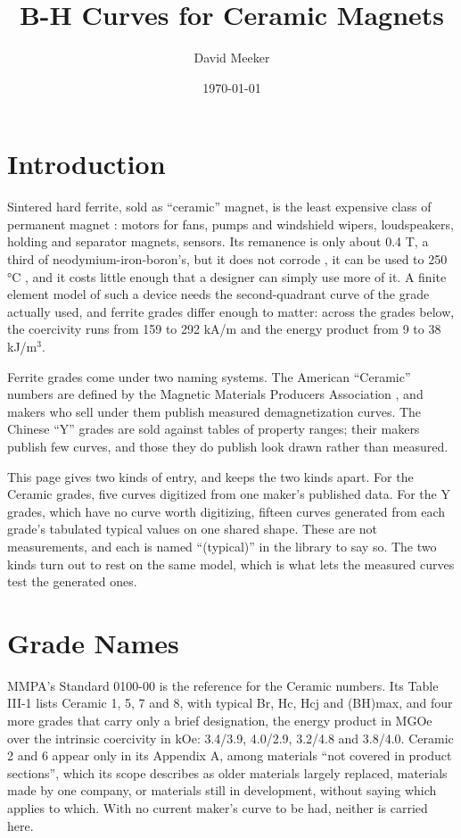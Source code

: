 \documentclass[
  11pt,
]{article}
\title{B-H Curves for Ceramic Magnets}
\author{David Meeker}
\date{\today}
\begin{document}
\maketitle

\section{Introduction}\label{introduction}

Sintered hard ferrite, sold as ``ceramic'' magnet, is the least expensive class of permanent magnet \cite{dexter}: motors for fans, pumps and windshield wipers, loudspeakers, holding and separator magnets, sensors. Its remanence is only about 0.4 T, a third of neodymium-iron-boron's, but it does not corrode \cite{eclipse}, it can be used to 250 °C \cite{dexter}, and it costs little enough that a designer can simply use more of it. A finite element model of such a device needs the second-quadrant curve of the grade actually used, and ferrite grades differ enough to matter: across the grades below, the coercivity runs from 159 to 292 kA/m and the energy product from 9 to 38 kJ/m\(^3\).

Ferrite grades come under two naming systems. The American ``Ceramic'' numbers are defined by the Magnetic Materials Producers Association \cite{mmpa}, and makers who sell under them publish measured demagnetization curves. The Chinese ``Y'' grades are sold against tables of property ranges; their makers publish few curves, and those they do publish look drawn rather than measured.

This page gives two kinds of entry, and keeps the two kinds apart. For the Ceramic grades, five curves digitized from one maker's published data. For the Y grades, which have no curve worth digitizing, fifteen curves generated from each grade's tabulated typical values on one shared shape. These are not measurements, and each is named ``(typical)'' in the library to say so. The two kinds turn out to rest on the same model, which is what lets the measured curves test the generated ones.

\section{Grade Names}\label{grade-names}

MMPA's Standard 0100-00 \cite{mmpa} is the reference for the Ceramic numbers. Its Table III-1 lists Ceramic 1, 5, 7 and 8, with typical Br, Hc, Hcj and (BH)max, and four more grades that carry only a brief designation, the energy product in MGOe over the intrinsic coercivity in kOe: 3.4/3.9, 4.0/2.9, 3.2/4.8 and 3.8/4.0. Ceramic 2 and 6 appear only in its Appendix A, among materials ``not covered in product sections'', which its scope describes as older materials largely replaced, materials made by one company, or materials still in development, without saying which applies to which. With no current maker's curve to be had, neither is carried here.
\end{document}
